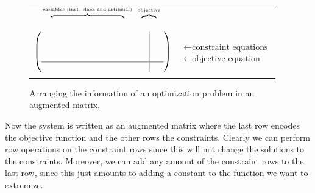 \begin{figure}
\begin{center}
\begin{tabular}{ll}
\ \ {$\overbrace{\phantom{VERYVERYERY}}^{\mbox{\tiny variables (incl. slack and artificial)}}$}\ 
{$\overbrace{\phantom{F}}^{\mbox{\tiny objective}}$}&\\
{$
\left(
\begin{array}{c|c}
\phantom{VERYVERYERYFATS}&\phantom{S}\\
\\
\\\hline
\\
\end{array}
\right)
$} &{$\begin{array}{l} \\ \leftarrow  \mbox{constraint equations} \\[6mm] \leftarrow \mbox{objective equation}\end{array}$}\\
\hspace{4.3cm}{$\begin{array}{c}\uparrow\\ \mbox{objective value}\end{array}\!\!\!\!\!\!\!\!$}
\end{tabular}
\end{center}
\caption{Arranging the information of an optimization problem in an augmented matrix.\label{augD}}
\end{figure}



Now the system is written as an augmented matrix where the last row encodes the objective function and the other rows the constraints. Clearly 
we can perform row operations on the constraint rows since this will not change the solutions to the constraints. 
Moreover, we can add any amount of the constraint rows to the last row,
since this just amounts to adding a constant to the function we want to extremize.

